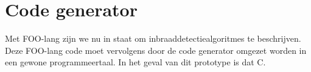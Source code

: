 
\section{Code generator}
\label{section:devel-codegen}

Met FOO-lang zijn we nu in staat om inbraaddetectiealgoritmes te beschrijven.
Deze FOO-lang code moet vervolgens door de code generator omgezet worden in een
gewone programmeertaal. In het geval van dit prototype is dat C.






